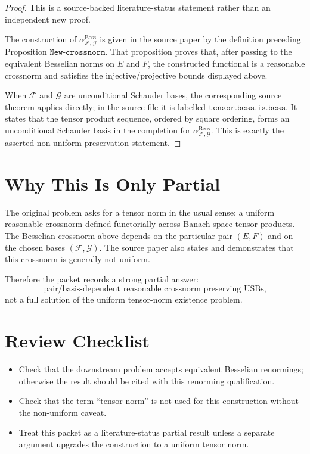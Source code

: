 \documentclass[11pt]{article}
\newcommand{\Bess}{\mathrm{Bess}}
\begin{document}
\begin{proof}
This is a source-backed literature-status statement rather than an
independent new proof.

The construction of
\(\alpha_{\mathcal F,\mathcal G}^{\Bess}\) is given in the source paper by
the definition preceding Proposition \(\texttt{New-crossnorm}\). That
proposition proves that, after passing to the equivalent Besselian norms
on \(E\) and \(F\), the constructed functional is a reasonable crossnorm
and satisfies the injective/projective bounds displayed above.

When \(\mathcal F\) and \(\mathcal G\) are unconditional Schauder bases,
the corresponding source theorem applies directly; in the source file it
is labelled \(\texttt{tensor.bess.is.bess}\). It states that the tensor
product sequence, ordered by square ordering, forms an unconditional
Schauder basis in the completion for
\(\alpha_{\mathcal F,\mathcal G}^{\Bess}\). This is exactly the asserted
non-uniform preservation statement.
\end{proof}

\section*{Why This Is Only Partial}

The original problem asks for a tensor norm in the usual sense: a uniform
reasonable crossnorm defined functorially across Banach-space tensor
products. The Besselian crossnorm above depends on the particular pair
\((E,F)\) and on the chosen bases \((\mathcal F,\mathcal G)\). The source
paper also states and demonstrates that this crossnorm is generally not
uniform.

Therefore the packet records a strong partial answer:
\[
  \text{pair/basis-dependent reasonable crossnorm preserving USBs,}
\]
not a full solution of the uniform tensor-norm existence problem.

\section*{Review Checklist}

\begin{itemize}
\item Check that the downstream problem accepts equivalent Besselian
renormings; otherwise the result should be cited with this renorming
qualification.
\item Check that the term ``tensor norm'' is not used for this
construction without the non-uniform caveat.
\item Treat this packet as a literature-status partial result unless a
separate argument upgrades the construction to a uniform tensor norm.
\end{itemize}
\end{document}
